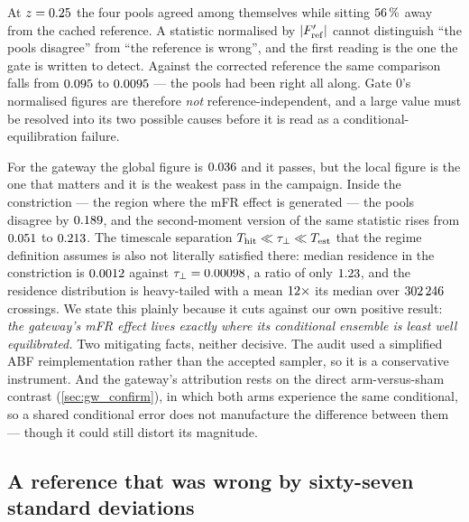 \begin{remark}
\label{rem:gate0_two_readings}
At $z = 0.25$ the four pools agreed among themselves while sitting $56\,\%$
away from the cached reference. A statistic normalised by $|F'_{\rm ref}|$ cannot distinguish
``the pools disagree'' from ``the reference is wrong'', and the first reading is the one the gate
is written to detect. Against the corrected reference the same comparison falls from
$0.095$ to $0.0095$ --- the pools had been right all along. Gate 0's
normalised figures are therefore \emph{not} reference-independent, and a large value must be
resolved into its two possible causes before it is read as a conditional-equilibration failure.
\end{remark}

For the gateway the global figure is $0.036$ and it passes, but the local figure is the one
that matters and it is the weakest pass in the campaign. Inside the constriction --- the region
where the mFR effect is generated --- the pools disagree by $0.189$, and the
second-moment version of the same statistic rises from $0.051$ to $0.213$. The
timescale separation $T_{\rm hit} \ll \tau_\perp \ll T_{\rm est}$ that the regime definition
assumes is also not literally satisfied there: median residence in the constriction is
$0.0012$ against $\tau_\perp = 0.00098$, a ratio of only $1.23$, and
the residence distribution is heavy-tailed with a mean $12\times$ its median over
$302\,246$ crossings. We state this plainly because it cuts against our own positive
result: \emph{the gateway's mFR effect lives exactly where its conditional ensemble is least
well equilibrated.} Two mitigating facts, neither decisive. The audit used a simplified ABF
reimplementation rather than the accepted sampler, so it is a conservative instrument. And the
gateway's attribution rests on the direct arm-versus-sham contrast (\cref{sec:gw_confirm}),
in which both arms experience the same conditional, so a shared conditional error does not
manufacture the difference between them --- though it could still distort its magnitude.

\subsection{A reference that was wrong by sixty-seven standard deviations}
\label{sec:reference_correction}

